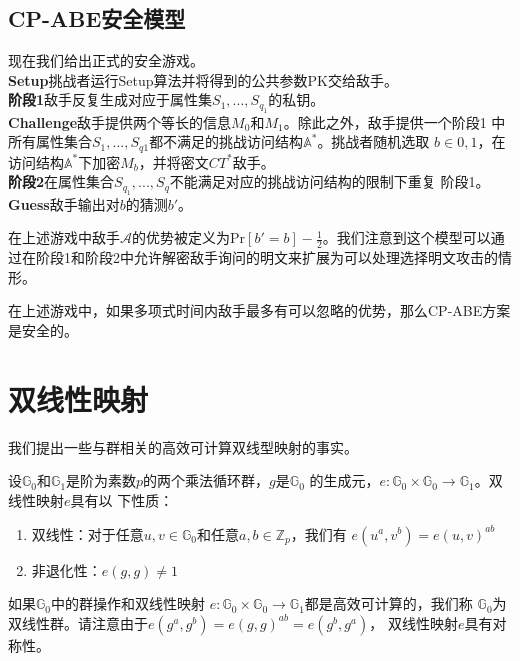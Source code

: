 \subsection{CP-ABE安全模型}
现在我们给出正式的安全游戏。\\
\textbf{Setup}\quad 挑战者运行Setup算法并将得到的公共参数PK交给敌手。\\
\textbf{阶段1}\quad 敌手反复生成对应于属性集$S_1,...,S_{q_1}$的私钥。\\
\textbf{Challenge}\quad 敌手提供两个等长的信息$M_0$和$M_1$。除此之外，敌手提供一个阶段1
中所有属性集合$S_1,...,S_{q1}$都不满足的挑战访问结构$\mathbb{A^*}$。挑战者随机选取
$b\in{0,1}$，在访问结构$\mathbb{A^*}$下加密$M_b$，并将密文$CT^*$敌手。\\
\textbf{阶段2}\quad 在属性集合$S_{q_1},...,S_q$不能满足对应的挑战访问结构的限制下重复
阶段1。\\
\textbf{Guess}\quad 敌手输出对$b$的猜测$b'$。\par
\vspace{3mm}
在上述游戏中敌手$\mathcal{A}$的优势被定义为$\mathrm{Pr}[b'=b]-\frac{1}{2}$。我们注意到这个模型可以通过在阶段1和阶段2中允许解密敌手询问的明文来扩展为可以处理选择明文攻击的情形。
\begin{Definition}
在上述游戏中，如果多项式时间内敌手最多有可以忽略的优势，那么CP-ABE方案是安全的。
\end{Definition}
\section{双线性映射}
我们提出一些与群相关的高效可计算双线型映射的事实。\par
设$\mathbb{G}_0$和$\mathbb{G}_1$是阶为素数$p$的两个乘法循环群，$g$是$\mathbb{G}_0$
的生成元，$e:\mathbb{G}_0\times \mathbb{G}_0\to \mathbb{G}_1$。双线性映射$e$具有以
下性质：
\begin{enumerate}
\setlength{\itemsep}{0pt}
\item 双线性：对于任意$u,v\in \mathbb{G}_0$和任意$a,b\in \mathbb{Z}_p$，我们有
$e(u^a,v^b) =e(u,v)^{ab}$
\item 非退化性：$e(g,g)\neq 1$
\end{enumerate}
\par
如果$\mathbb{G}_0$中的群操作和双线性映射
$e:\mathbb{G}_0\times \mathbb{G}_0\to\mathbb{G}_1$都是高效可计算的，我们称
$\mathbb{G}_0$为双线性群。请注意由于$e(g^a,g^b)=e(g,g)^{ab}=e(g^b,g^a)$，
双线性映射$e$具有对称性。
